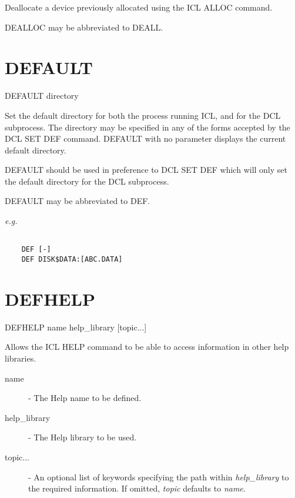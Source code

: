 \documentclass[twoside,11pt]{report}
\newcommand{\xlabel}[1]{}
\begin{document}
 Deallocate a device previously allocated using the ICL ALLOC command.

 DEALLOC may be abbreviated to DEALL.

\section{\xlabel{DEFAULT}DEFAULT\label{DEFAULT}}

   DEFAULT \hspace{.5cm} directory

 Set the default directory for both the process running ICL, and for the
 DCL subprocess. The directory may be specified in any of the forms
 accepted by the DCL  SET DEF command. DEFAULT with no parameter
 displays the current default directory.

 DEFAULT should be used in preference to DCL SET DEF which will only
 set the default directory for the DCL subprocess.

 DEFAULT may be abbreviated to DEF.

{\em e.g.}
\begin{verbatim}

    DEF [-]
    DEF DISK$DATA:[ABC.DATA]

\end{verbatim}

\section{\xlabel{DEFHELP}DEFHELP\label{DEFHELP}}

   DEFHELP \hspace{.5cm} name \hspace{.5cm} help\_library \hspace{.5cm}
[topic...]

 Allows the ICL HELP command to be able to access information in other
 help libraries.

\begin{description}

 \item[name] - The Help name to be defined.

 \item[help\_library] - The Help library to be used.

 \item[topic...] - An optional list of keywords specifying the path within
{\em help\_library} to the required information. If omitted, {\em topic}
defaults to {\em name}.

\end{description}
\end{document}
